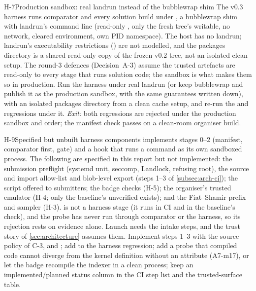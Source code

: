 \begin{issue}{H-7}{Production sandbox: real landrun instead of the bubblewrap shim}
\IRprob The v0.3 harness runs comparator and every solution build under
, a bubblewrap shim with landrun's command line (read-only \code{/},
only the fresh tree's  writable, no network, cleared environment, own PID namespace).
The host has no landrun; landrun's executability restrictions () are not modelled, and
the packages directory is a shared read-only copy of the frozen v0.2 tree, not an isolated clean
setup.
\IRwhy The round-3 defences (Decision~A-3) assume the trusted artefacts are read-only to every stage
that runs solution code; the sandbox is what makes them so in production.
\IRres Run the harness under real landrun (or keep bubblewrap and publish it as the production
sandbox, with the same guarantees written down), with an isolated packages directory from a clean
cache setup, and re-run the  and  regressions under it.
\emph{Exit:} both regressions are rejected under the production sandbox and order; the manifest
check passes on a clean-room organiser build.
\end{issue}

\begin{issue}{H-9}{Specified but unbuilt harness components}
\IRprob {} implements stages 0--2 (manifest, comparator first, gate) and a
 hook that runs a command as its own sandboxed process. The following are specified in
this report but not implemented: the submission preflight (systemd unit, seccomp, Landlock, refusing
root), the source and import allow-list and blob-level export (steps 1--3 of \cref{subsec:arch-ci});
the  script offered to submitters; the badge checks (H-5); the organiser's trusted
emulator (H-4; only the baseline's unverified  exists); and the Fiat--Shamir prefix and
sampler (H-3).  is not a harness stage (it runs in CI and in the baseline's
check), and the  probe has never run through comparator or the harness, so its
rejection rests on  evidence alone.
\IRwhy Launch needs the intake steps, and the trust story of \cref{sec:architecture} assumes them.
\IRres Implement steps 1--3 with the source policy of C-3, and ; add 
to the harness regression; add a probe that compiled code cannot diverge from the kernel definition
without an attribute (A7-m17), or let the badge recompile the indexer in a clean process; keep an
implemented/planned status column in the CI step list and the trusted-surface table.
\end{issue}

